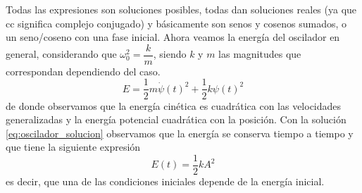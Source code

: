\documentclass[a4paper]{article}
\numberwithin{equation}{section}
\begin{document}
    Todas las expresiones son soluciones posibles, todas dan soluciones reales (ya que cc significa complejo conjugado) y básicamente son senos y cosenos sumados, o un seno/coseno con una fase inicial.
    Ahora veamos la energía del oscilador en general, considerando que $\omega_0^2 = \dfrac{k}{m}$, siendo $k$ y $m$ las magnitudes que correspondan dependiendo del caso.
    \begin{equation}
        E = \frac{1}{2} m \dot{\psi}(t)^2 + \frac{1}{2} k \psi(t)^2
        \label{eq:oscilador_energia}
    \end{equation}
    de donde observamos que la energía cinética es cuadrática con las velocidades generalizadas y la energía potencial cuadrática con la posición. Con la solución \ref{eq:oscilador_solucion} observamos que la energía se conserva tiempo a tiempo y que tiene la siguiente expresión
    \begin{equation}
        E(t) = \frac{1}{2} k A^2
        \label{eq:oscilador_energia_tiempo}
    \end{equation}
    es decir, que una de las condiciones iniciales depende de la energía inicial.
\end{document}
